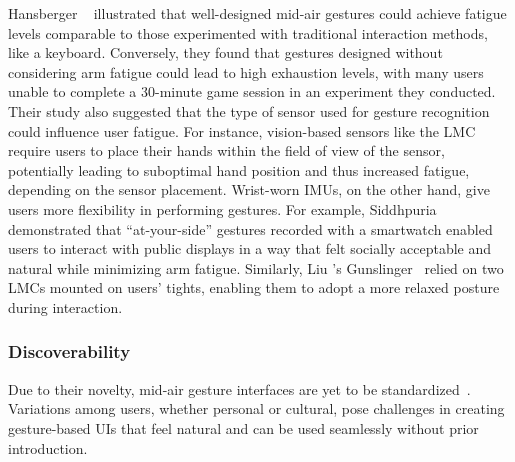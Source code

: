 Hansberger \etal~\cite{Hansberger:2017} illustrated that well-designed mid-air gestures could achieve fatigue levels comparable to those experimented with traditional interaction methods, like a keyboard. Conversely, they found that gestures designed without considering arm fatigue could lead to high exhaustion levels, with many users unable to complete a 30-minute game session in an experiment they conducted.
%
Their study also suggested that the type of sensor used for gesture recognition could influence user fatigue. For instance, vision-based sensors like the LMC require users to place their hands within the field of view of the sensor, potentially leading to suboptimal hand position and thus increased fatigue, depending on the sensor placement. 
%
Wrist-worn IMUs, on the other hand, give users more flexibility in performing gestures. For example, Siddhpuria \etal~\cite{Siddhpuria:2017} demonstrated that ``at-your-side'' gestures recorded with a smartwatch enabled users to interact with public displays in a way that felt socially acceptable and natural while minimizing arm fatigue. 
Similarly, Liu \etal's Gunslinger~\cite{Liu:2015} relied on two LMCs mounted on users' tights, enabling them to adopt a more relaxed posture during interaction.


\subsubsection{Discoverability} \label{sec:state_of_the_art:overview:challenges:discoverability}
Due to their novelty, mid-air gesture interfaces are yet to be standardized~\cite{Norman:2010}. Variations among users, whether personal or cultural, pose challenges in creating gesture-based UIs that feel natural and can be used seamlessly without prior introduction.

